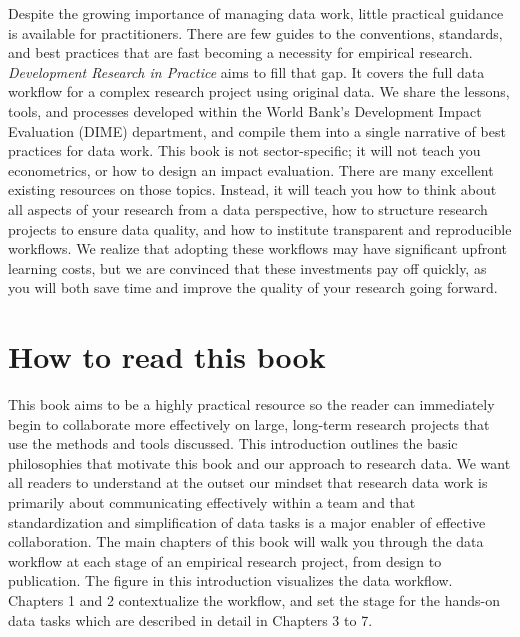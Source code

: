 \documentclass[]{tufte-book}
\begin{document}
Despite the growing importance of managing data work, little practical
guidance is available for practitioners. There are few guides to the
conventions, standards, and best practices that are fast becoming a
necessity for empirical research. \emph{Development Research in
Practice} aims to fill that gap. It covers the full data workflow for a
complex research project using original data. We share the lessons,
tools, and processes developed within the World Bank's Development
Impact Evaluation (DIME) department, and compile them into a single
narrative of best practices for data work. This book is not
sector-specific; it will not teach you econometrics, or how to design an
impact evaluation. There are many excellent existing resources on those
topics. Instead, it will teach you how to think about all aspects of
your research from a data perspective, how to structure research
projects to ensure data quality, and how to institute transparent and
reproducible workflows. We realize that adopting these workflows may
have significant upfront learning costs, but we are convinced that these
investments pay off quickly, as you will both save time and improve the
quality of your research going forward.

\hypertarget{how-to-read-this-book}{%
\section*{How to read this book}\label{how-to-read-this-book}}

This book aims to be a highly practical resource so the reader can
immediately begin to collaborate more effectively on large, long-term
research projects that use the methods and tools discussed. This
introduction outlines the basic philosophies that motivate this book and
our approach to research data. We want all readers to understand at the
outset our mindset that research data work is primarily about
communicating effectively within a team and that standardization and
simplification of data tasks is a major enabler of effective
collaboration. The main chapters of this book will walk you through the
data workflow at each stage of an empirical research project, from
design to publication. The figure in this introduction visualizes the
data workflow. Chapters 1 and 2 contextualize the workflow, and set the
stage for the hands-on data tasks which are described in detail in
Chapters 3 to 7.
\end{document}
